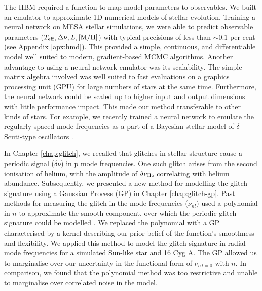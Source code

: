 
The HBM required a function to map model parameters to observables. We built an emulator to approximate 1D numerical models of stellar evolution. Training a neural network on MESA stellar simulations, we were able to predict observable parameters (\({T_\mathrm{eff}}, {\Delta\nu}, L, [\mathrm{M/H}]\)) with typical precisions of less than \(\sim 0.1\) per cent (see Appendix \ref{apx:hmd}). This provided a simple, continuous, and differentiable model well suited to modern, gradient-based MCMC algorithms. Another advantage to using a neural network emulator was its scalability. The simple matrix algebra involved was well suited to fast evaluations on a graphics processing unit (GPU) for large numbers of stars at the same time. Furthermore, the neural network could be scaled up to higher input and output dimensions with little performance impact. This made our method transferable to other kinds of stars. For example, we recently trained a neural network to emulate the regularly spaced mode frequencies as a part of a Bayesian stellar model of \(\delta\) Scuti-type oscillators \citep{Scutt.Murphy.ea2023}.

In Chapter \ref{chap:glitch}, we recalled that glitches in stellar structure cause a periodic signal (\(\delta\nu\)) in p mode frequencies. One such glitch arises from the second ionisation of helium, with the amplitude of \(\delta\nu_{{\mathrm{He}}}\) correlating with helium abundance. Subsequently, we presented a new method for modelling the glitch signature using a Gaussian Process (GP) in Chapter \ref{chap:glitch-gp}. Past methods for measuring the glitch in the mode frequencies (\(\nu_{nl}\)) used a polynomial in \(n\) to approximate the smooth component, over which the periodic glitch signature could be modelled \citep[e.g.][]{Mazumdar.Monteiro.ea2014,Verma.Raodeo.ea2019}. We replaced the polynomial with a GP characterised by a kernel describing our prior belief of the function's smoothness and flexibility. We applied this method to model the glitch signature in radial mode frequencies for a simulated Sun-like star and 16 Cyg A. The GP allowed us to marginalise over our uncertainty in the functional form of \(\nu_{n\,l=0}\) with \(n\). In comparison, we found that the polynomial method was too restrictive and unable to marginalise over correlated noise in the model.

